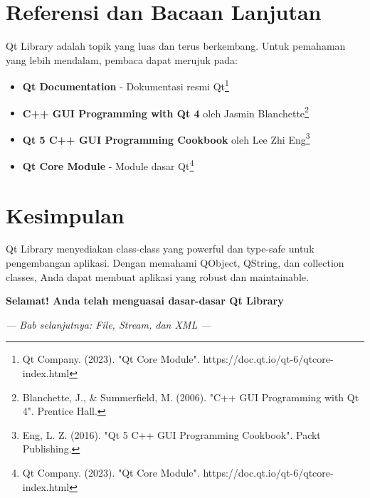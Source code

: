 \section{Referensi dan Bacaan Lanjutan}

Qt Library adalah topik yang luas dan terus berkembang. Untuk pemahaman yang lebih mendalam, pembaca dapat merujuk pada:

\begin{itemize}
\item \textbf{Qt Documentation} - Dokumentasi resmi Qt\footnote{Qt Company. (2023). "Qt Core Module". https://doc.qt.io/qt-6/qtcore-index.html}
\item \textbf{C++ GUI Programming with Qt 4} oleh Jasmin Blanchette\footnote{Blanchette, J., \& Summerfield, M. (2006). "C++ GUI Programming with Qt 4". Prentice Hall.}
\item \textbf{Qt 5 C++ GUI Programming Cookbook} oleh Lee Zhi Eng\footnote{Eng, L. Z. (2016). "Qt 5 C++ GUI Programming Cookbook". Packt Publishing.}
\item \textbf{Qt Core Module} - Module dasar Qt\footnote{Qt Company. (2023). "Qt Core Module". https://doc.qt.io/qt-6/qtcore-index.html}
\end{itemize}

\section{Kesimpulan}

Qt Library menyediakan class-class yang powerful dan type-safe untuk pengembangan aplikasi. Dengan memahami QObject, QString, dan collection classes, Anda dapat membuat aplikasi yang robust dan maintainable.

\begin{center}
\textbf{Selamat! Anda telah menguasai dasar-dasar Qt Library}
\end{center}

\vspace{1cm}

\begin{center}
\textit{--- Bab selanjutnya: File, Stream, dan XML ---}
\end{center}
